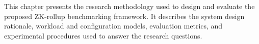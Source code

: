 This chapter presents the research methodology used to design and evaluate the proposed ZK-rollup benchmarking framework. It describes the system design rationale, workload and configuration models, evaluation metrics, and experimental procedures used to answer the research questions.